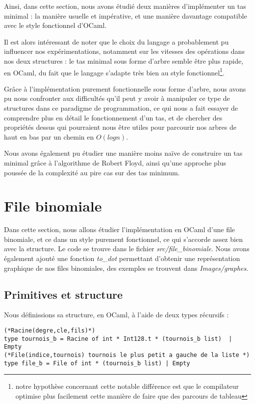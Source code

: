 \documentclass[12pt,a4paper]{article}
\begin{document}
Ainsi, dans cette section, nous avons étudié deux manières d'implémenter un tas minimal : la manière usuelle et impérative, et une manière davantage compatible avec le style fonctionnel d'OCaml.

Il est alors intéressant de noter que le choix du langage a probablement pu influencer nos expérimentations, notamment sur les vitesses des opérations dans nos deux structures : le tas minimal sous forme d'arbre semble être plus rapide, en OCaml, du fait que le langage s'adapte très bien au style fonctionnel\footnote{notre hypothèse concernant cette notable différence est que le compilateur optimise plus facilement cette manière de faire que des parcours de tableau}.

Grâce à l'implémentation purement fonctionnelle sous forme d'arbre, nous avons pu nous confronter aux difficultés qu'il peut y avoir à manipuler ce type de structures dans ce paradigme de programmation, ce qui nous a fait essayer de comprendre plus en détail le fonctionnement d'un tas, et de chercher des propriétés dessus qui pourraient nous être utiles pour parcourir nos arbres de haut en bas par un chemin en $O(log n)$.

Nous avons également pu étudier une manière moins naïve de construire un tas minimal grâce à l'algorithme de Robert Floyd\cite{ACM}, ainsi qu'une approche plus poussée de la complexité au pire cas sur des tas minimum.

\newpage
 \section{File binomiale}

Dans cette section, nous allons étudier l'implémentation en OCaml d'une file binomiale\cite{TasBinom}, et ce dans un style purement fonctionnel, ce qui s'accorde assez bien avec la structure.
Le code se trouve dans le fichier \textit{src/file\_binomiale}. Nous avons également ajouté une fonction \textit{to\_dot} permettant d'obtenir une représentation graphique de nos files binomiales, des exemples se trouvent dans \textit{Images/graphes}.

\subsection{Primitives et structure}

Nous définissions sa structure, en OCaml, à l'aide de deux types récursifs : 

\bigskip \begin{lstlisting}
(*Racine(degre,cle,fils)*)
type tournois_b = Racine of int * Int128.t * (tournois_b list)  | Empty 
(*File(indice,tournois) tournois le plus petit a gauche de la liste *) 
type file_b = File of int * (tournois_b list) | Empty 
\end{lstlisting} \bigskip
\end{document}
